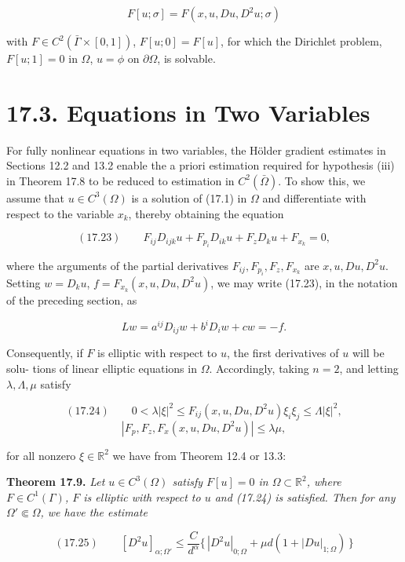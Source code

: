 \[
F[u; \sigma] = F(x, u, D u, D^2 u; \sigma)
\]

with $F \in C^2(\bar{\Gamma} \times [0,1])$, $F[u;0] = F[u]$, for which the Dirichlet problem,
$F[u;1] = 0$ in $\Omega$, $u = \phi$ on $\partial\Omega$, is solvable.

\section*{17.3. Equations in Two Variables}

For fully nonlinear equations in two variables, the H\"older gradient estimates in
Sections 12.2 and 13.2 enable the a priori estimation required for hypothesis (iii)
in Theorem 17.8 to be reduced to estimation in $C^2(\bar{\Omega})$. To show this, we assume that
$u \in C^3(\Omega)$ is a solution of (17.1) in $\Omega$ and differentiate with respect to the variable $x_k$,
thereby obtaining the equation

\[
(17.23) \qquad F_{ij} D_{ijk}u + F_{p_i} D_{ik}u + F_z D_k u + F_{x_k} = 0,
\]

where the arguments of the partial derivatives $F_{ij}, F_{p_i}, F_z, F_{x_k}$ are $x, u, D u, D^2u$.
Setting $w = D_k u$, $f = F_{x_k}(x, u, D u, D^2u)$, we may write (17.23), in the notation of
the preceding section, as

\[
Lw = a^{ij}D_{ij}w + b^iD_i w + c w = -f.
\]

Consequently, if $F$ is elliptic with respect to $u$, the first derivatives of $u$ will be solu-
tions of linear elliptic equations in $\Omega$. Accordingly, taking $n = 2$, and letting $\lambda, \Lambda, \mu$
satisfy

\[
(17.24) \qquad 0 < \lambda |\xi|^2 \leq F_{ij}(x, u, D u, D^2u)\xi_i\xi_j \leq \Lambda |\xi|^2,
\]
\[
|F_p, F_z, F_x(x, u, D u, D^2u)| \leq \lambda\mu,
\]




\noindent for all nonzero $\xi \in \mathbb{R}^{2}$ we have from Theorem 12.4 or 13.3:

\medskip

\noindent \textbf{Theorem 17.9.} \textit{Let $u \in C^{3}(\Omega)$ satisfy $F[u] = 0$ in $\Omega \subset \mathbb{R}^{2}$, where $F \in C^{1}(\Gamma)$, $F$ is elliptic with respect to $u$ and (17.24) is satisfied. Then for any $\Omega' \Subset \Omega$, we have the estimate}

\[
(17.25)\qquad [D^{2}u]_{\alpha;\Omega'} \le \frac{C}{d^{\alpha}}\{\,|D^{2}u|_{0;\Omega} + \mu d(1 + |Du|_{1;\Omega})\,\}
\]

